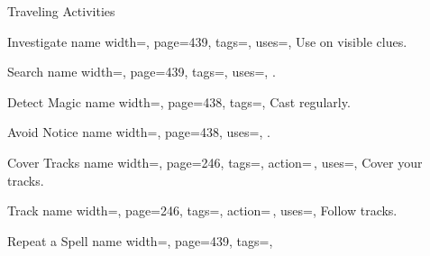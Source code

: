 \begin{PageFrontLandscape}
\begin{TablesHalf}{\frontTableHeight}
\begin{Table}{Traveling Activities}
\begin{entry}{Investigate}{%
                name width=\activityLength,%
                page=439,
                tags=\Concentrate,
                uses={\VariousKnowledge[tags=S]},
            }
                Use  on visible clues.\hfill
                \quad
            \end{entry}
            \begin{entry}{Search}{%
                name width=\activityLength,%
                page=439,
                tags=\Concentrate,
                uses={\Perception[tags=S]},
            }
                . \hfill
            \end{entry}
            \begin{entry}{Detect Magic}{%
                name width=\activityLength,%
                page=438,
                tags=\Concentrate,
            }
                Cast  regularly.\hfill
            \end{entry}
            \breakLine
            \begin{entry}{Avoid Notice}{%
                name width=\activityLength,%
                page=438,
                uses={\Stealth[tags=S]},
            }
                .  \hfill{}\quad {}
            \end{entry}
            \begin{entry}{Cover Tracks}{%
                name width=\activityLength,%
                page=246,
                tags=\Move\Concentrate,
                action=\,,
                uses={\Survival[tags=T]},
            }
                Cover your tracks.
            \end{entry}
            \begin{entry}{Track}{%
                name width=\activityLength,%
                page=246,
                tags=\Move\Concentrate,
                action=\,,
                uses={\Survival[tags=T]},
            }
                Follow tracks.\hfill {}\quad
            \end{entry}
            \breakLine
            \begin{entry}{Repeat a Spell}{%
                name width=\activityLength,%
                page=439,
                tags=\Concentrate,
            }

\end{entry}
\end{Table}
\end{TablesHalf}
\end{PageFrontLandscape}
